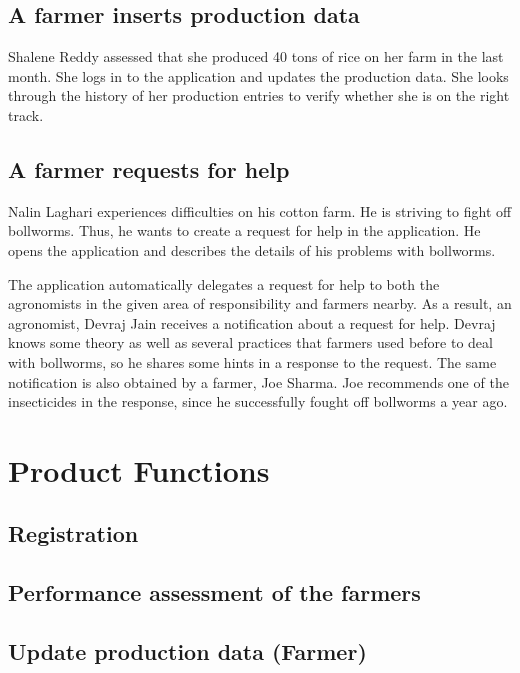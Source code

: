 \subsection*{A farmer inserts production data}
Shalene Reddy assessed that she produced 40 tons of rice on her farm in the last month. She logs in to the application and updates the production data. She looks through the history of her production entries to verify whether she is on the right track. 

\subsection*{A farmer requests for help}
Nalin Laghari experiences difficulties on his cotton farm. He is striving to fight off bollworms. Thus, he wants to create a request for help in the application. He opens the application and describes the details of his problems with bollworms.

The application automatically delegates a request for help to both the agronomists in the given area of responsibility and farmers nearby. As a result, an agronomist, Devraj Jain receives a notification about a request for help. Devraj knows some theory as well as several practices that farmers used before to deal with bollworms, so he shares some hints in a response to the request. The same notification is also obtained by a farmer, Joe Sharma. Joe recommends one of the insecticides in the response, since he successfully fought off bollworms a year ago.

\section{Product Functions}
\subsection{Registration}

\subsection{Performance assessment of the farmers}

\subsection{Update production data (Farmer)}

